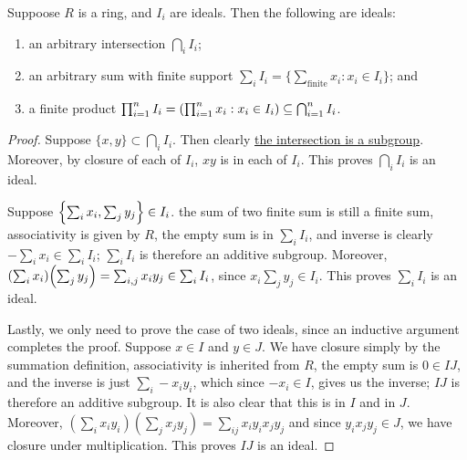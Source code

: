 \begin{proposition}\label{prop:ideal-operations}
    Suppoose \(R\) is a ring,
    and \(I_i\) are ideals.
    Then the following are ideals:
    \begin{enumerate}[label={(\alph*)}, itemsep=0mm]
        \item an arbitrary intersection \(\bigcap_i I_i\);
        \item an arbitrary sum with finite support \(\sum_i I_i = \{\sum_\text{finite} x_i : x_i \in I_i\}\); and
        \item a finite product \(\prod_{i=1}^n I_i = \pqty{\prod_{i=1}^n x_i : x_i \in I_i} \subseteq \bigcap_{i=1}^n I_i\).
    \end{enumerate}
\end{proposition}
\begin{proof}
    Suppose \(\{x,y\} \subset \bigcap_i I_i\). Then clearly
    \hyperref[lem:intersection-subgroup]{the intersection is a subgroup}.
    Moreover, by closure of each of \(I_i\),
    \(xy\) is in each of \(I_i\).
    This proves \(\bigcap_i I_i\) is an ideal.

    Suppose \(\Bqty{\sum_i x_i, \sum_j y_j} \in I_i\).
    the sum of two finite sum is still a finite sum,
    associativity is given by \(R\),
    the empty sum is in \(\sum_i I_i\),
    and inverse is clearly \(-\sum_i x_i \in \sum_i I_i\);
    \(\sum_i I_i\) is therefore an additive subgroup.
    Moreover, \(\pqty{\sum_i x_i}\pqty{\sum_j y_j} = \sum_{i,j} x_i y_j \in \sum_i I_i\),
    since \(x_i \sum_j y_j \in I_i\).
    This proves \(\sum_i I_i\) is an ideal.

    Lastly, we only need to prove the case of two ideals,
    since an inductive argument completes the proof.
    Suppose \(x \in I\) and \(y \in J\).
    We have closure simply by the summation definition,
    associativity is inherited from \(R\),
    the empty sum is \(0 \in IJ\),
    and the inverse is just \(\sum_i -x_i y_i\),
    which since \(-x_i \in I\), gives us the inverse;
    \(IJ\) is therefore an additive subgroup.
    It is also clear that this is in \(I\) and in \(J\).
    Moreover, \((\sum_i x_i y_i)(\sum_j x_j y_j)
    = \sum_{ij} x_i y_i x_j y_j\)
    and since \(y_i x_j y_j \in J\),
    we have closure under multiplication.
    This proves \(IJ\) is an ideal.
\end{proof}
